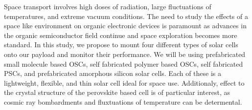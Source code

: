 	Space transport involves high doses of radiation, large fluctuations of temperatures, and extreme vacuum conditions. The need to study the effects of a space like environment on organic electronic devices is paramount as advances in the organic semiconductor field continue and space exploration becomes more standard. In this study, we propose to mount four different types of solar cells onto our payload and monitor their performance. We will be using prefabricated small molecule based OSCs, self fabricated polymer based OSCs, self fabricated PSCs, and prefabricated amorphous silicon solar cells. Each of these is a lightweight, flexible, and thin solar cell ideal for space use. Additionaly, effect to the crystal structure of the perovskite based cell is of particular interest, as cosmic ray bombardments and fluxtuations of temperature can be determental. 
	






